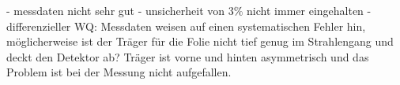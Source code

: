
- messdaten nicht sehr gut
- unsicherheit von $3\%$ nicht immer eingehalten
- differenzieller WQ: Messdaten weisen auf einen systematischen Fehler hin, möglicherweise ist der Träger für die Folie nicht tief genug im Strahlengang und deckt den Detektor ab?
Träger ist vorne und hinten asymmetrisch und das Problem ist bei der Messung nicht aufgefallen.
